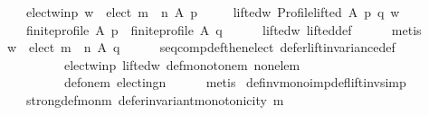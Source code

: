 \begin{isabellebody}
\ \ \ \ elect{\isacharunderscore}{\kern0pt}w{\isacharunderscore}{\kern0pt}in{\isacharunderscore}{\kern0pt}p{\isacharcolon}{\kern0pt}\ {\isachardoublequoteopen}w\ {\isasymin}\ elect\ {\isacharparenleft}{\kern0pt}m\ {\isasymtriangleright}\ n{\isacharparenright}{\kern0pt}\ A\ p{\isachardoublequoteclose}\ \isanewline
\ \ \ \ lifted{\isacharunderscore}{\kern0pt}w{\isacharcolon}{\kern0pt}\ {\isachardoublequoteopen}Profile{\isachardot}{\kern0pt}lifted\ A\ p\ q\ w{\isachardoublequoteclose}\isanewline
\ \ \isamarkupfalse%
\isanewline
\ \ \ \ {\isachardoublequoteopen}finite{\isacharunderscore}{\kern0pt}profile\ A\ p\ {\isasymand}\ finite{\isacharunderscore}{\kern0pt}profile\ A\ q{\isachardoublequoteclose}\isanewline
\ \ \ \ \isamarkupfalse%
\ lifted{\isacharunderscore}{\kern0pt}w\ lifted{\isacharunderscore}{\kern0pt}def\isanewline
\ \ \ \ \isamarkupfalse%
\ metis\isanewline
\ \ \isamarkupfalse%
\ {\isachardoublequoteopen}w\ {\isasymin}\ elect\ {\isacharparenleft}{\kern0pt}m\ {\isasymtriangleright}\ n{\isacharparenright}{\kern0pt}\ A\ q{\isachardoublequoteclose}\isanewline
\ \ \ \ \isamarkupfalse%
\ seq{\isacharunderscore}{\kern0pt}comp{\isacharunderscore}{\kern0pt}def{\isacharunderscore}{\kern0pt}then{\isacharunderscore}{\kern0pt}elect\ defer{\isacharunderscore}{\kern0pt}lift{\isacharunderscore}{\kern0pt}invariance{\isacharunderscore}{\kern0pt}def\isanewline
\ \ \ \ \ \ \ \ \ \ elect{\isacharunderscore}{\kern0pt}w{\isacharunderscore}{\kern0pt}in{\isacharunderscore}{\kern0pt}p\ lifted{\isacharunderscore}{\kern0pt}w\ def{\isacharunderscore}{\kern0pt}monotone{\isacharunderscore}{\kern0pt}m\ non{\isacharunderscore}{\kern0pt}ele{\isacharunderscore}{\kern0pt}m\isanewline
\ \ \ \ \ \ \ \ \ \ def{\isacharunderscore}{\kern0pt}one{\isacharunderscore}{\kern0pt}m\ electing{\isacharunderscore}{\kern0pt}n\isanewline
\ \ \ \ \isamarkupfalse%
\ metis\isanewline
{}\isamarkupfalse%
%
\endisatagproof
{\isafoldproof}%
%
\isadelimproof
\isanewline
%
\endisadelimproof
\isanewline
\isanewline
{}\isamarkupfalse%
\ def{\isacharunderscore}{\kern0pt}inv{\isacharunderscore}{\kern0pt}mono{\isacharunderscore}{\kern0pt}imp{\isacharunderscore}{\kern0pt}def{\isacharunderscore}{\kern0pt}lift{\isacharunderscore}{\kern0pt}inv{\isacharbrackleft}{\kern0pt}simp{\isacharbrackright}{\kern0pt}{\isacharcolon}{\kern0pt}\isanewline
\ \ \isanewline
\ \ \ \ strong{\isacharunderscore}{\kern0pt}def{\isacharunderscore}{\kern0pt}mon{\isacharunderscore}{\kern0pt}m{\isacharcolon}{\kern0pt}\ {\isachardoublequoteopen}defer{\isacharunderscore}{\kern0pt}invariant{\isacharunderscore}{\kern0pt}monotonicity\ m{\isachardoublequoteclose}\ \isanewline

\end{isabellebody}
